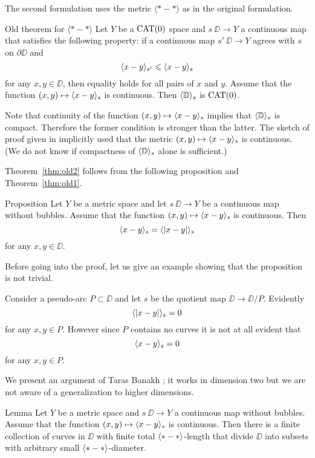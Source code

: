 The second formulation uses the metric $\langle{*}-{*}\rangle$ as in the original formulation.

\begin{thm}{Old theorem for $\bm{\langle{*}-{*}\rangle}$}\label{thm:old2}
Let $Y$ be a $\mathop{\rm CAT}\nolimits(0)$ space and $s\:\DD\to Y$ a continuous map that satisfies the following property: 
if a continuous map $s'\:\DD\to Y$ agrees with $s$ on $\partial\DD$ and
\[\langle x-y\rangle_{s'}\leqslant \langle x-y\rangle_{s}\]
for any $x,y\in \DD$,
then equality holds for all pairs of $x$ and $y$.
Assume that the function $(x,y)\mapsto\langle x-y\rangle_{s}$ is continuous.
Then $\langle\mathbb{D}\rangle_s$ is $\mathop{\rm CAT}\nolimits(0)$.
\end{thm}

Note that continuity of the function $(x,y)\mapsto\langle x-y\rangle_{s}$
implies that $\langle\mathbb{D}\rangle_s$ is compact.
Therefore the former condition is stronger than the latter.  
The sketch of proof given in \cite{petrunin-metric-min} implicitly used that the metric $(x,y)\zz\mapsto\<x-y\>_{s}$ is continuous.
(We do not know if compactness of $\langle\mathbb{D}\rangle_s$ alone is sufficient.)

Theorem~\ref{thm:old2} follows from the following proposition and Theorem~\ref{thm:old1}.
 
\begin{thm}{Proposition}\label{prop:<||>=<>}
Let $Y$ be a metric space and let $s\:\DD\to Y$ be a continuous map without bubbles.
Assume that the function $(x,y)\mapsto \langle x-y\rangle_s$ is continuous.
Then 
\[\langle x-y\rangle_s=\langle|x-y|\rangle_s\]
for any $x,y\in \DD$.
\end{thm}

Before going into the proof, let us give an example showing that the proposition is not trivial.

Consider a pseudo-arc $P\subset \DD$ and let $s$ be the quotient map $\DD\to \DD/P$.
Evidently 
\[\langle|x-y|\rangle_s=0\]
for any $x,y\in P$.
However since $P$ contains no curves it is not at all evident that 
\[\langle x-y\rangle_s=0\]
for any $x,y\in P$.

We present an argument of Taras Banakh \cite{banakh};
it works in dimension two but we are not aware of a generalization to higher dimensions.

\begin{thm}{Lemma}\label{lem:subdivision}
Let $Y$ be a metric space and $s\:\DD\to Y$ a continuous map without bubbles.
Assume that the function $(x,y)\mapsto \langle x-y\rangle_s$ is continuous.
Then there is a finite collection of curves in $\DD$ with finite total $\langle{*}-{*}\rangle$-length 
that divide $\DD$ into subsets with arbitrary small $\langle{*}-{*}\rangle$-diameter.
\end{thm}

